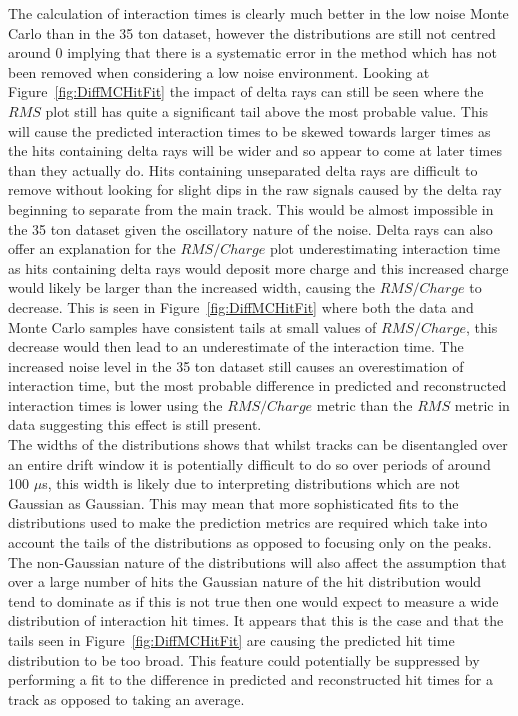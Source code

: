 The calculation of interaction times is clearly much better in the low noise Monte Carlo than in the 35 ton dataset, however the distributions are still not centred around 0 implying that there is a systematic error in the method which has not been removed when considering a low noise environment. Looking at Figure~\ref{fig:DiffMCHitFit} the impact of delta rays can still be seen where the $RMS$ plot still has quite a significant tail above the most probable value. This will cause the predicted interaction times to be skewed towards larger times as the hits containing delta rays will be wider and so appear to come at later times than they actually do. Hits containing unseparated delta rays are difficult to remove without looking for slight dips in the raw signals caused by the delta ray beginning to separate from the main track. This would be almost impossible in the 35 ton dataset given the oscillatory nature of the noise. Delta rays can also offer an explanation for the $RMS/Charge$ plot underestimating interaction time as hits containing delta rays would deposit more charge and this increased charge would likely be larger than the increased width, causing the $RMS/Charge$ to decrease. This is seen in Figure~\ref{fig:DiffMCHitFit} where both the data and Monte Carlo samples have consistent tails at small values of $RMS/Charge$, this decrease would then lead to an underestimate of the interaction time. The increased noise level in the 35 ton dataset still causes an overestimation of interaction time, but the most probable difference in predicted and reconstructed interaction times is lower using the $RMS/Charge$ metric than the $RMS$ metric in data suggesting this effect is still present. \\

The widths of the distributions shows that whilst tracks can be disentangled over an entire drift window it is potentially difficult to do so over periods of around 100 $\mu$s, this width is likely due to interpreting distributions which are not Gaussian as Gaussian. This may mean that more sophisticated fits to the distributions used to make the prediction metrics are required which take into account the tails of the distributions as opposed to focusing only on the peaks. The non-Gaussian nature of the distributions will also affect the assumption that over a large number of hits the Gaussian nature of the hit distribution would tend to dominate as if this is not true then one would expect to measure a wide distribution of interaction hit times. It appears that this is the case and that the tails seen in Figure~\ref{fig:DiffMCHitFit} are causing the predicted hit time distribution to be too broad. This feature could potentially be suppressed by performing a fit to the difference in predicted and reconstructed hit times for a track as opposed to taking an average. 

